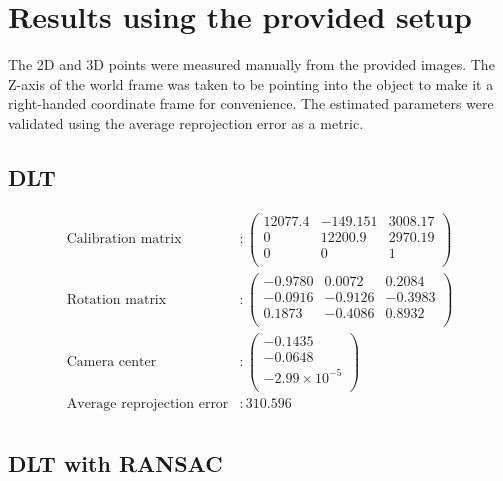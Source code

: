 \documentclass[a4paper,11pt]{article}
\begin{document}
  \vspace{2em}
 
 \section{Results using the provided setup}
  
  The 2D and 3D points were measured manually from the provided images. The Z-axis of the world frame was taken to be pointing into the object to make it a right-handed coordinate frame for convenience. The estimated parameters were validated using the average reprojection error as a metric.
 \subsection*{DLT}
  \begin{align*}
  \text{Calibration matrix}
  &:
  \begin{pmatrix}
  12077.4 & -149.151 & 3008.17 \\
  0 & 12200.9 & 2970.19 \\
  0 & 0 & 1 \\
  \end{pmatrix}\\
  \text{Rotation matrix}
  &:
  \begin{pmatrix}
   -0.9780 & 0.0072 & 0.2084 \\
   -0.0916 & -0.9126 & -0.3983 \\
   0.1873 & -0.4086 & 0.8932 \\
  \end{pmatrix}\\
  \text{Camera center}
  &:
  \begin{pmatrix}
   -0.1435\\
   -0.0648\\
   -2.99\times10^{-5}\\
  \end{pmatrix}\\
  \text{Average reprojection error}
  &: 310.596\\
  \end{align*}
 
 \subsection*{DLT with RANSAC}
 
\end{document}
